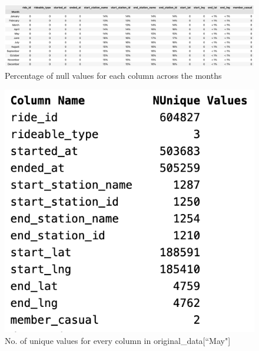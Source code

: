 \documentclass[12pt]{article}
\begin{document}
\begin{itemize}
	\begin{figure}[h]
	\hspace{-0.5in}
	\includegraphics[scale=0.48]{imgNAN.png}
	\caption{Percentage of null values for each column across the months}
	\label{fig4}
	\end{figure}
	
	\begin{figure}[h]
	\centering
	\includegraphics[scale = 0.6]{imgUni.png} 
	\caption{No. of unique values for every column in original\_data[``May"]}
	\label{fig2}
	\end{figure}
	

\end{itemize}
\end{document}
